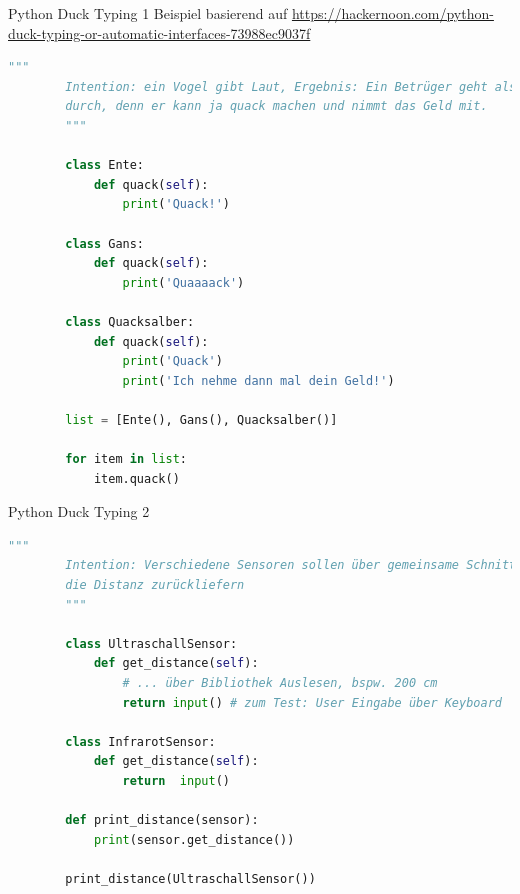 \begin{frame}[fragile]{Python Duck Typing 1}
    Beispiel basierend auf \url{https://hackernoon.com/python-duck-typing-or-automatic-interfaces-73988ec9037f}

    \begin{lstlisting}[language=Python, gobble=8]
        """
        Intention: ein Vogel gibt Laut, Ergebnis: Ein Betrüger geht als Vogel
        durch, denn er kann ja quack machen und nimmt das Geld mit.
        """

        class Ente:
            def quack(self):
                print('Quack!')

        class Gans:
            def quack(self):
                print('Quaaaack')

        class Quacksalber:
            def quack(self):
                print('Quack')
                print('Ich nehme dann mal dein Geld!')

        list = [Ente(), Gans(), Quacksalber()]

        for item in list:
            item.quack()
    \end{lstlisting}
\end{frame}

\begin{frame}[fragile]{Python Duck Typing 2}
    \begin{lstlisting}[language=Python, gobble=8]
        """
        Intention: Verschiedene Sensoren sollen über gemeinsame Schnittstelle
        die Distanz zurückliefern
        """

        class UltraschallSensor:
            def get_distance(self):
                # ... über Bibliothek Auslesen, bspw. 200 cm
                return input() # zum Test: User Eingabe über Keyboard

        class InfrarotSensor:
            def get_distance(self):
                return  input()

        def print_distance(sensor):
            print(sensor.get_distance())

        print_distance(UltraschallSensor())
    \end{lstlisting}
\end{frame}

